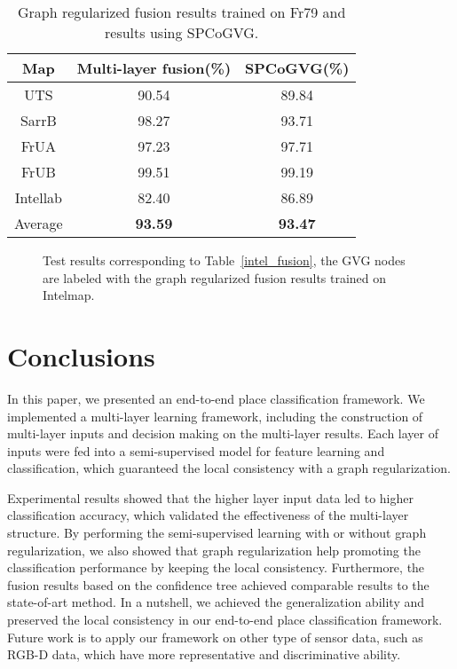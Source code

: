 \documentclass[letterpaper, 10 pt, conference]{ieeeconf}  %
\begin{document}
\begin{table}[tpb]
\caption{Graph regularized fusion results trained on Fr79 and results using SPCoGVG.}
\label{fr79_fusion}
\begin{center}
\begin{tabular}{ccc}
Map     &Multi-layer fusion(\%)     &SPCoGVG(\%)        \\
\hline
UTS     &90.54	    &89.84	    \\
SarrB   &98.27	    &93.71      \\
FrUA    &97.23	    &97.71	    \\
FrUB    &99.51	    &99.19	    \\
Intellab    &82.40	    &86.89	    \\
Average     &\textbf{93.59}	    &\textbf{93.47}	    \\
\end{tabular}
\end{center}
\end{table}



\begin{figure*}[tpb]
\centering
{}
\caption{Test results corresponding to Table~\ref{intel_fusion}, the GVG nodes are labeled with the graph regularized fusion results trained on Intelmap.}
\label{final}
\end{figure*}


\section{Conclusions}\label{secConclu}
In this paper, we presented an end-to-end place classification framework. We implemented a multi-layer learning framework, including the construction of multi-layer inputs and decision making on the multi-layer results. Each layer of inputs were fed into a semi-supervised model for feature learning and classification, which guaranteed the local consistency with a graph regularization.

Experimental results showed that the higher layer input data led to higher classification accuracy, which validated the effectiveness of the multi-layer structure. By performing the semi-supervised learning with or without graph regularization, we also showed that graph regularization help promoting the classification performance by keeping the local consistency. Furthermore, the fusion results based on the confidence tree achieved comparable results to the state-of-art method. In a nutshell, we achieved the generalization ability and preserved the local consistency in our end-to-end place classification framework. Future work is to apply our framework on other type of sensor data, such as RGB-D data, which have more representative and discriminative ability.










\end{document}
